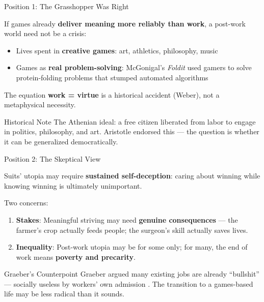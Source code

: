\documentclass[aspectratio=169,11pt]{beamer}
\begin{document}
\begin{frame}[t]{Position 1: The Grasshopper Was Right}
\begin{probox}
\footnotesize
If games already \textbf{deliver meaning more reliably than work}, a post-work world need not be a crisis:
\begin{itemize}
    \item Lives spent in \textbf{creative games}: art, athletics, philosophy, music
    \item Games as \textbf{real problem-solving}: McGonigal's \emph{Foldit} used gamers to solve protein-folding problems that stumped automated algorithms
\end{itemize}

\vspace{0.05cm}
The equation \textbf{work = virtue} is a historical accident (Weber), not a metaphysical necessity.
\end{probox}

\vspace{0.12cm}
\begin{alertblock}{Historical Note}
\scriptsize
The Athenian ideal: a free citizen liberated from labor to engage in politics, philosophy, and art. Aristotle endorsed this --- the question is whether it can be generalized democratically.
\end{alertblock}
\end{frame}

\begin{frame}[t]{Position 2: The Skeptical View}
\begin{objectionbox}
\footnotesize
Suits' utopia may require \textbf{sustained self-deception}: caring about winning while knowing winning is ultimately unimportant.

\vspace{0.08cm}
Two concerns:
\begin{enumerate}
    \item \textbf{Stakes}: Meaningful striving may need \textbf{genuine consequences} --- the farmer's crop actually feeds people; the surgeon's skill actually saves lives.
    \item \textbf{Inequality}: Post-work utopia may be for some only; for many, the end of work means \textbf{poverty and precarity}.
\end{enumerate}
\end{objectionbox}

\vspace{0.12cm}
\begin{alertblock}{Graeber's Counterpoint}
\scriptsize
Graeber argued many existing jobs are already ``bullshit'' --- socially useless by workers' own admission \parencite{graeber_bullshit_jobs}. The transition to a games-based life may be less radical than it sounds.
\end{alertblock}
\end{frame}
\end{document}
